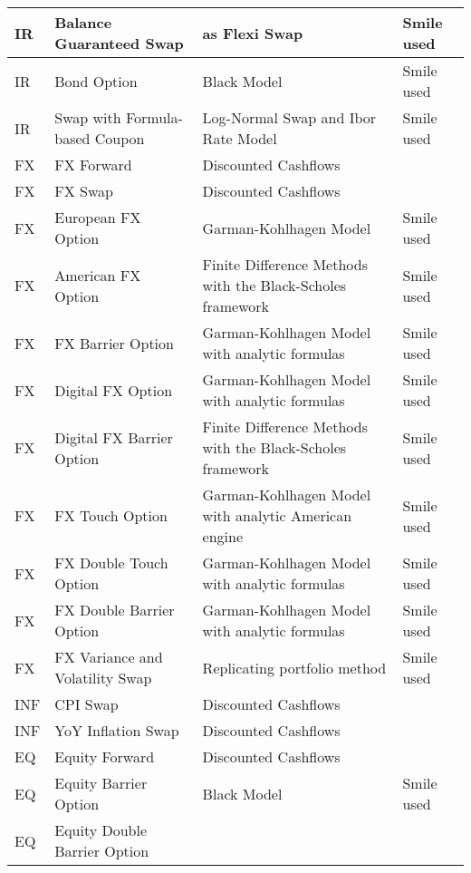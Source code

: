 {\begin{supertabular}{|p{1cm}|p{5cm}|p{5cm}|p{2cm}|}
\hline
IR	&
Balance Guaranteed Swap	&
as Flexi Swap &
Smile used \\
\hline
IR	&
Bond Option &
Black Model &
Smile used \\
\hline
IR	&
Swap with Formula-based Coupon	&
Log-Normal Swap and Ibor Rate Model &
Smile used \\
\hline
\hline
FX	&
FX Forward	&
Discounted Cashflows	&
\\
\hline
FX	&
FX Swap	&
Discounted Cashflows&
\\
\hline
FX	& 
European FX Option	&
Garman-Kohlhagen Model	&
Smile used\\
\hline
FX	&
American FX Option	&
Finite Difference Methods with the Black-Scholes framework &
Smile used\\
\hline
FX	&
FX Barrier Option	&
Garman-Kohlhagen Model with analytic formulas &
Smile used\\
\hline
FX	&
Digital FX Option	&
Garman-Kohlhagen Model with analytic formulas &
Smile used \\
\hline
FX	&
Digital FX Barrier Option	&
Finite Difference Methods with the Black-Scholes framework	&
Smile used \\
\hline
FX & 
FX Touch Option	&
Garman-Kohlhagen Model with analytic American engine&
Smile used\\
\hline
FX	&
FX Double Touch Option	&
Garman-Kohlhagen Model with analytic formulas &
Smile used \\
\hline 
FX	&
FX Double Barrier Option	&
Garman-Kohlhagen Model with analytic formulas &
Smile used \\
\hline 
FX	&
FX Variance and Volatility Swap	&
Replicating portfolio method &
Smile used \\
\hline
\hline
INF	&
CPI Swap &
Discounted Cashflows	&
\\
\hline
INF	&
YoY Inflation Swap	&
Discounted Cashflows &
\\
\hline
\hline
EQ	&
Equity Forward	&
Discounted Cashflows	&
\\
\hline
EQ	&
Equity Barrier Option	&
Black Model &
Smile used\\
\hline
EQ	&
Equity Double Barrier Option	&

\end{supertabular}}
